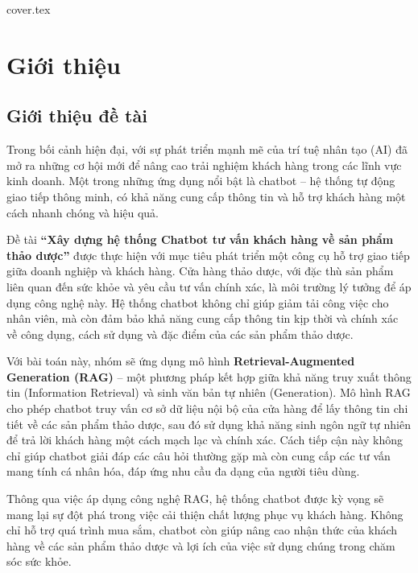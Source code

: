 \documentclass{article}
\numberwithin{equation}{section}
\numberwithin{equation}{section}
\begin{document}
\begin{titlepage}
{cover.tex}
\end{titlepage}
\clearpage
\newpage
\LARGE
\setcounter{page}{1}
\tableofcontents
\clearpage
\newpage
\Large
\section{\textbf{Giới thiệu}}
\subsection{Giới thiệu đề tài}
Trong bối cảnh hiện đại, với sự phát triển mạnh mẽ của trí tuệ nhân tạo (AI) đã mở ra những cơ hội mới để nâng cao trải nghiệm khách hàng trong các lĩnh vực kinh doanh. Một trong những ứng dụng nổi bật là chatbot – hệ thống tự động giao tiếp thông minh, có khả năng cung cấp thông tin và hỗ trợ khách hàng một cách nhanh chóng và hiệu quả.

Đề tài \textbf{“Xây dựng hệ thống Chatbot tư vấn khách hàng về sản phẩm thảo dược”} được thực hiện với mục tiêu phát triển một công cụ hỗ trợ giao tiếp giữa doanh nghiệp và khách hàng. Cửa hàng thảo dược, với đặc thù sản phẩm liên quan đến sức khỏe và yêu cầu tư vấn chính xác, là môi trường lý tưởng để áp dụng công nghệ này. Hệ thống chatbot không chỉ giúp giảm tải công việc cho nhân viên, mà còn đảm bảo khả năng cung cấp thông tin kịp thời và chính xác về công dụng, cách sử dụng và đặc điểm của các sản phẩm thảo dược.

Với bài toán này, nhóm sẽ ứng dụng mô hình \textbf{Retrieval-Augmented Generation (RAG)} – một phương pháp kết hợp giữa khả năng truy xuất thông tin (Information Retrieval) và sinh văn bản tự nhiên (Generation). Mô hình RAG cho phép chatbot truy vấn cơ sở dữ liệu nội bộ của cửa hàng để lấy thông tin chi tiết về các sản phẩm thảo dược, sau đó sử dụng khả năng sinh ngôn ngữ tự nhiên để trả lời khách hàng một cách mạch lạc và chính xác. Cách tiếp cận này không chỉ giúp chatbot giải đáp các câu hỏi thường gặp mà còn cung cấp các tư vấn mang tính cá nhân hóa, đáp ứng nhu cầu đa dạng của người tiêu dùng.

Thông qua việc áp dụng công nghệ RAG, hệ thống chatbot được kỳ vọng sẽ mang lại sự đột phá trong việc cải thiện chất lượng phục vụ khách hàng. Không chỉ hỗ trợ quá trình mua sắm, chatbot còn giúp nâng cao nhận thức của khách hàng về các sản phẩm thảo dược và lợi ích của việc sử dụng chúng trong chăm sóc sức khỏe.
\end{document}
